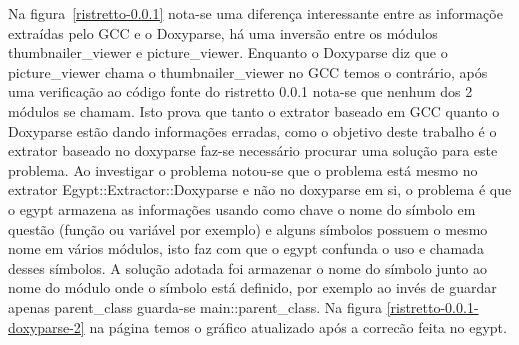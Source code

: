 Na figura~\ref{ristretto-0.0.1} nota-se uma diferença interessante entre as
informaçõe extraídas pelo GCC e o Doxyparse, há uma inversão entre os módulos
thumbnailer\_viewer e picture\_viewer. Enquanto o Doxyparse diz que o
picture\_viewer chama o thumbnailer\_viewer no GCC temos o contrário, após uma
verificação ao código fonte do ristretto 0.0.1 nota-se que nenhum dos 2 módulos
se chamam. Isto prova que tanto o extrator baseado em GCC quanto o Doxyparse
estão dando informações erradas, como o objetivo deste trabalho é o extrator
baseado no doxyparse faz-se necessário procurar uma solução para este problema.
Ao investigar o problema notou-se que o problema está mesmo no extrator
Egypt::Extractor::Doxyparse e não no doxyparse em si, o problema é que o egypt
armazena as informações usando como chave o nome do símbolo em questão (função
ou variável por exemplo) e alguns símbolos possuem o mesmo nome em vários
módulos, isto faz com que o egypt confunda o uso e chamada desses símbolos. A
solução adotada foi armazenar o nome do símbolo junto ao nome do módulo onde o
símbolo está definido, por exemplo ao invés de guardar apenas parent\_class
guarda-se main::parent\_class. Na figura \ref{ristretto-0.0.1-doxyparse-2} na página \pageref{ristretto-0.0.1-doxyparse-2} temos o gráfico atualizado após a correcão feita no egypt.

